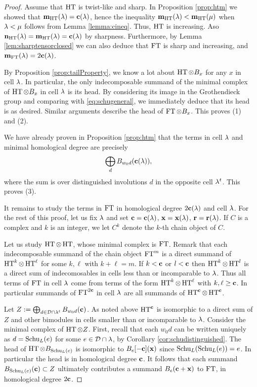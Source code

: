 \begin{proof}
Assume that $\operatorname{HT}$ is twist-like and sharp.  In Proposition \ref{prop:htm} we showed that ${\mathbf m}_{\operatorname{HT}}(\lambda)=\mathbf{c}(\lambda)$, hence the inequality ${\mathbf m}_{\operatorname{HT}}(\lambda)<{\mathbf m}_{\operatorname{HT}}(\mu)$ when $\lambda<\mu$ follows from Lemma \ref{lemma:cineq}.  Thus, $\operatorname{HT}$ is increasing.  Aso ${\mathbf n}_{\operatorname{HT}}(\lambda)={\mathbf m}_{\operatorname{HT}}(\lambda)=\mathbf{c}(\lambda)$ by sharpness.  Furthermore, by Lemma \ref{lem:sharptensorclosed} we can also deduce that $\operatorname{FT}$ is sharp and increasing, and ${\mathbf m}_{\operatorname{FT}}(\lambda) =  2\mathbf{c}(\lambda)$.

By Proposition \ref{prop:tailProperty}, we know a lot about $\operatorname{HT} \otimes B_x$ for any $x$ in cell $\lambda$. In particular, the only indecomposable summand of the minimal complex of $\operatorname{HT} \otimes B_x$ in cell $\lambda$ is its head. By considering its image in the Grothendieck group and comparing with \eqref{eq:schugeneral}, we immediately deduce that its head is as desired. Similar arguments describe the head of $\operatorname{FT} \otimes B_x$.  This proves (1) and (2).

We have already proven in Proposition \ref{prop:htm} that the terms in cell $\lambda$ and minimal homological degree are precisely
\[
\bigoplus_d B_{w_0 d}(\mathbf{c}(\lambda)),
\]
where the sum is over distinguished involutions $d$ in the opposite cell $\lambda^t$.  This proves (3).  



It remains to study the terms in $\operatorname{FT}$ in homological degree $2\mathbf{c}(\lambda)$ and cell $\lambda$. For the rest of this proof, let us fix $\lambda$ and set $\mathbf{c} = \mathbf{c}(\lambda)$, $\mathbf{x} = \mathbf{x}(\lambda)$, $\mathbf{r} = \mathbf{r}(\lambda)$.  If $C$ is a complex and $k$ is an integer, we let $C^k$ denote the $k$-th chain object of $C$.

Let us study $\operatorname{HT}\otimes \operatorname{HT}$, whose minimal complex is $\operatorname{FT}$.   Remark that each indecomposable summand of the chain object $\operatorname{FT}^m$ is a direct summand of $\operatorname{HT}^k\otimes \operatorname{HT}^{\ell}$ for some $k,\ell$ with $k+\ell=m$.   If $k<\mathbf{c}$ or $l<\mathbf{c}$ then $\operatorname{HT}^k\otimes \operatorname{HT}^l$ is a direct sum of indecomosables in cells less than or incomparable to $\lambda$.  Thus all terms of $\operatorname{FT}$ in cell $\lambda$ come from terms of the form $\operatorname{HT}^k\otimes \operatorname{HT}^{\ell}$ with $k,\ell\geq \mathbf{c}$.  In particular summands of $\operatorname{FT}^{2\mathbf{c}}$ in cell $\lambda$ are all summands of $\operatorname{HT}^{\mathbf{c}}\otimes \operatorname{HT}^{\mathbf{c}}$.

Let $Z:=\bigoplus_{d\in {\mathcal{D}}\cap \lambda^t} B_{w_0d}(\mathbf{c})$.  As noted above $\operatorname{HT}^{\mathbf{c}}$ is isomorphic to a direct sum of $Z$ and other bimodules in cells smaller than or incomparable to $\lambda$.  Consider the minimal complex of $\operatorname{HT}\otimes Z$.  First, recall that each $w_0d$ can be written uniquely as $d=\operatorname{Schu}_L(e)$ for some $e\in {\mathcal{D}}\cap \lambda$, by Corollary \ref{cor:schudistinguished}.  The head of $\operatorname{HT}\otimes B_{\operatorname{Schu}_L(e)}$ is isomorphic to $B_e[-\mathbf{c}](\mathbf{x})$ since $\operatorname{Schu}_L(\operatorname{Schu}_L(e))=e$.  In particular the head is in homological degree $\mathbf{c}$.  It follows that each summand $B_{\operatorname{Schu}_L(e)}(\mathbf{c})\subset Z$ ultimately contributes a summand $B_e(\mathbf{c}+\mathbf{x})$ to $\operatorname{FT}$, in homological degree $2\mathbf{c}$.


\end{proof}
